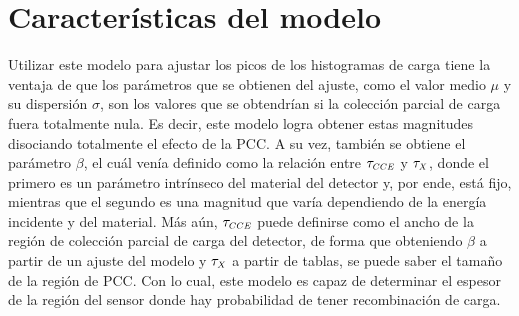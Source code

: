 \section{Características del modelo}
\noindent Utilizar este modelo para ajustar los picos de los histogramas de carga tiene la ventaja de que los parámetros que se obtienen del ajuste, como el valor medio $\mu$ y su dispersión $\sigma$, son los valores que se obtendrían si la colección parcial de carga fuera totalmente nula. Es decir, este modelo logra obtener estas magnitudes disociando totalmente el efecto de la PCC. A su vez, también se obtiene el parámetro $\beta$, el cuál venía definido como la relación entre $\tau_{\scaleto{CCE}{4pt}}$ y $\tau_{\scaleto{X}{4pt}}$, donde el primero es un parámetro intrínseco del material del detector y, por ende, está fijo, mientras que el segundo es una magnitud que varía dependiendo de la energía incidente y del material. Más aún, $\tau_{\scaleto{CCE}{4pt}}$ puede definirse como el ancho de la región de colección parcial de carga del detector, de forma que obteniendo $\beta$ a partir de un ajuste del modelo y $\tau_{\scaleto{X}{4pt}}$ a partir de tablas, se puede saber el tamaño de la región de PCC. Con lo cual, este modelo es capaz de determinar el espesor de la región del sensor donde hay probabilidad de tener recombinación de carga.

